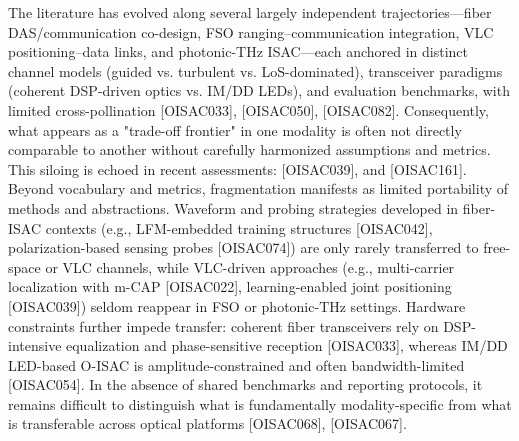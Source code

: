 {} The literature has evolved along several largely independent trajectories—fiber DAS/communication co-design, FSO ranging–communication integration, VLC positioning–data links, and photonic-THz ISAC—each anchored in distinct channel models (guided vs. turbulent vs. LoS-dominated), transceiver paradigms (coherent DSP-driven optics vs. IM/DD LEDs), and evaluation benchmarks, with limited cross-pollination [O\markdownRendererUnderscore{}ISAC\markdownRendererUnderscore{}033], [O\markdownRendererUnderscore{}ISAC\markdownRendererUnderscore{}050], [O\markdownRendererUnderscore{}ISAC\markdownRendererUnderscore{}082]. Consequently, what appears as a "trade-off frontier" in one modality is often not directly comparable to another without carefully harmonized assumptions and metrics. This siloing is echoed in recent assessments:  [O\markdownRendererUnderscore{}ISAC\markdownRendererUnderscore{}039], and  [O\markdownRendererUnderscore{}ISAC\markdownRendererUnderscore{}161].\markdownRendererParagraphSeparator
{} Beyond vocabulary and metrics, fragmentation manifests as limited portability of methods and abstractions. Waveform and probing strategies developed in fiber-ISAC contexts (e.g., LFM-embedded training structures [O\markdownRendererUnderscore{}ISAC\markdownRendererUnderscore{}042], polarization-based sensing probes [O\markdownRendererUnderscore{}ISAC\markdownRendererUnderscore{}074]) are only rarely transferred to free-space or VLC channels, while VLC-driven approaches (e.g., multi-carrier localization with m-CAP [O\markdownRendererUnderscore{}ISAC\markdownRendererUnderscore{}022], learning-enabled joint positioning [O\markdownRendererUnderscore{}ISAC\markdownRendererUnderscore{}039]) seldom reappear in FSO or photonic-THz settings. Hardware constraints further impede transfer: coherent fiber transceivers rely on DSP-intensive equalization and phase-sensitive reception [O\markdownRendererUnderscore{}ISAC\markdownRendererUnderscore{}033], whereas IM/DD LED-based O-ISAC is amplitude-constrained and often bandwidth-limited [O\markdownRendererUnderscore{}ISAC\markdownRendererUnderscore{}054]. In the absence of shared benchmarks and reporting protocols, it remains difficult to distinguish what is fundamentally modality-specific from what is transferable across optical platforms [O\markdownRendererUnderscore{}ISAC\markdownRendererUnderscore{}068], [O\markdownRendererUnderscore{}ISAC\markdownRendererUnderscore{}067].\markdownRendererParagraphSeparator
